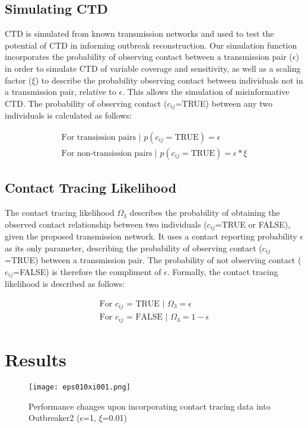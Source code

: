 \documentclass{article}
\begin{document}
\subsection{Simulating CTD}
	CTD is simulated from known transmission networks and used to test the potential of CTD in informing outbreak reconstruction. Our simulation function incorporates the probability of observing contact between a transmission pair ($\epsilon$) in order to simulate CTD of variable coverage and sensitivity, as well as a scaling factor ($\xi$) to describe the probability observing contact between individuals not in a transmission pair, relative to $\epsilon$. This allows the simulation of misinformative CTD. The probability of observing contact ($c_{ij}$=TRUE) between any two individuals is calculated as follows:
	
	\begin{gather}
	\text{For transission pairs | } p(c_{ij}=\text{TRUE}) = \epsilon \\
	\text{For non-transission pairs | } p(c_{ij}=\text{TRUE}) = \epsilon*\xi
	\end{gather}

\subsection{Contact Tracing Likelihood}
	The contact tracing likelihood $\Omega_3$ describes the probability of obtaining the observed contact relationship between two individuals ($c_{ij}$=TRUE or FALSE), given the proposed transmission network. It uses a contact reporting probability $\epsilon$ as its only parameter, describing the probability of observing contact ($c_{ij}$=TRUE) between a transmission pair. The probability of not observing contact ($c_{ij}$=FALSE) is therefore the compliment of $\epsilon$. Formally, the contact tracing likelihood is described as follows:
	
	\begin{gather}
	\text{For $c_{ij}$ = TRUE | } \Omega_3 = \epsilon \\
	\text{For $c_{ij}$ = FALSE | } \Omega_3 = 1-\epsilon
	\end{gather}

	\section{Results}

	\begin{figure}[H]
		\centering
		\texttt{[image: eps010xi001.png]}
		\caption{Performance changes upon incorporating contact tracing data into Outbreaker2 ($\epsilon$=1, $\xi$=0.01)}
	\end{figure}
	
\end{document}
